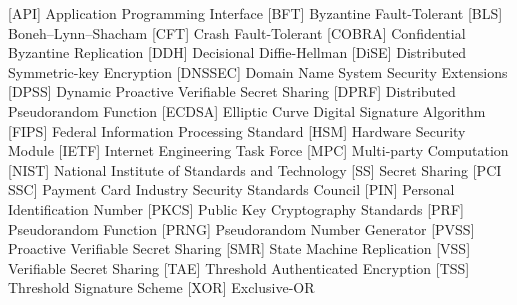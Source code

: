 \begin{acronym}[ICANN]
        [API]    {Application Programming Interface}
       [BFT]   {Byzantine Fault-Tolerant}
       [BLS]   {Boneh–Lynn–Shacham}
       [CFT]   {Crash Fault-Tolerant}
       [COBRA]   {Confidential Byzantine Replication}
       [DDH]   {Decisional Diffie-Hellman}
       [DiSE]   {Distributed Symmetric-key Encryption}
       [DNSSEC]   {Domain Name System Security Extensions}
       [DPSS]   {Dynamic Proactive Verifiable Secret Sharing}
       [DPRF]   {Distributed Pseudorandom Function}
       [ECDSA]   {Elliptic Curve Digital Signature Algorithm}
        [FIPS]    {Federal Information Processing Standard}
        [HSM]    {Hardware Security Module}
        [IETF]    {Internet Engineering Task Force}
       [MPC]   {Multi-party Computation}
       [NIST]   {National Institute of Standards and Technology}
         [SS]     {Secret Sharing}
       [PCI SSC]   {Payment Card Industry Security Standards Council}
       [PIN]   {Personal Identification Number}
       [PKCS]   {Public Key Cryptography Standards}
       [PRF]   {Pseudorandom Function}
       [PRNG]   {Pseudorandom Number Generator}
       [PVSS]   {Proactive Verifiable Secret Sharing}
       [SMR]   {State Machine Replication}
       [VSS]   {Verifiable Secret Sharing}
       [TAE]   {Threshold Authenticated Encryption}
       [TSS]   {Threshold Signature Scheme}
       [XOR]   {Exclusive-OR}
\end{acronym}